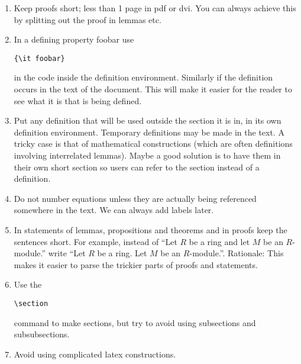 \begin{enumerate}
\item Keep proofs short; less than 1 page in pdf or dvi.
You can always achieve this by splitting out the proof in lemmas
etc.
\item In a defining property foobar use
\begin{verbatim}
{\it foobar}
\end{verbatim}
in the code inside the definition environment.
Similarly if the definition occurs in the text of the document.
This will make it easier for the reader to see what it is
that is being defined.
\item Put any definition that will be used outside the section
it is in, in its own definition environment. Temporary definitions
may be made in the text. A tricky case is that of mathematical
constructions (which are often definitions involving interrelated
lemmas). Maybe a good solution is to have them in their own
short section so users can refer to the section instead of
a definition.
\item Do not number equations unless they are actually being
referenced somewhere in the text. We can always add labels later.
\item In statements of lemmas, propositions and theorems and
in proofs keep the sentences short. For example, instead of
``Let $R$ be a ring and let $M$ be an $R$-module.'' write
``Let $R$ be a ring. Let $M$ be an $R$-module.''. Rationale:
This makes it easier to parse the trickier parts of proofs and
statements.
\item Use the
\begin{verbatim}
\section
\end{verbatim}
command to make sections, but try to avoid using subsections
and subsubsections.
\item Avoid using complicated latex constructions.
\end{enumerate}











